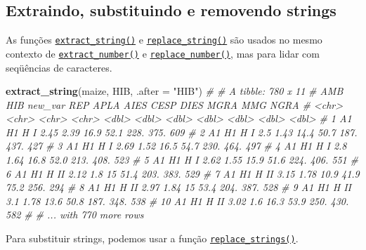 \documentclass[
]{book}
\newenvironment{Shaded}{\begin{snugshade}}{\end{snugshade}}
\newcommand{\CommentTok}[1]{\textcolor[rgb]{0.56,0.35,0.01}{\textit{#1}}}
\newcommand{\DataTypeTok}[1]{\textcolor[rgb]{0.13,0.29,0.53}{#1}}
\newcommand{\KeywordTok}[1]{\textcolor[rgb]{0.13,0.29,0.53}{\textbf{#1}}}
\newcommand{\NormalTok}[1]{#1}
\newcommand{\StringTok}[1]{\textcolor[rgb]{0.31,0.60,0.02}{#1}}
\begin{document}
\hypertarget{extraindo-substituindo-e-removendo-strings}{%
\subsection{Extraindo, substituindo e removendo strings}\label{extraindo-substituindo-e-removendo-strings}}

As funções \href{https://tiagoolivoto.github.io/metan/reference/utils_num_str.html}{\texttt{extract\_string()}} e \href{https://tiagoolivoto.github.io/metan/\%20reference\%20/\%20utils_num_str.html}{\texttt{replace\_string()}} são usados no mesmo contexto de \href{https://tiagoolivoto.github.io/metan/reference/utils_num_str.html}{\texttt{extract\_number()}} e \href{https\%20:\%20//tiagoolivoto.github.io/metan/reference/utils_num_str.html}{\texttt{replace\_number()}}, mas para lidar com seqüências de caracteres.

\begin{Shaded}
\begin{Highlighting}[]
\KeywordTok{extract_string}\NormalTok{(maize, HIB, }\DataTypeTok{.after =} \StringTok{"HIB"}\NormalTok{)}
\CommentTok{# # A tibble: 780 x 11}
\CommentTok{#    AMB   HIB   new_var REP    APLA  AIES  CESP  DIES  MGRA   MMG  NGRA}
\CommentTok{#    <chr> <chr> <chr>   <chr> <dbl> <dbl> <dbl> <dbl> <dbl> <dbl> <dbl>}
\CommentTok{#  1 A1    H1    H       I      2.45  2.39  16.9  52.1 228.   375.   609}
\CommentTok{#  2 A1    H1    H       I      2.5   1.43  14.4  50.7 187.   437.   427}
\CommentTok{#  3 A1    H1    H       I      2.69  1.52  16.5  54.7 230.   464.   497}
\CommentTok{#  4 A1    H1    H       I      2.8   1.64  16.8  52.0 213.   408.   523}
\CommentTok{#  5 A1    H1    H       I      2.62  1.55  15.9  51.6 224.   406.   551}
\CommentTok{#  6 A1    H1    H       II     2.12  1.8   15    51.4 203.   383.   529}
\CommentTok{#  7 A1    H1    H       II     3.15  1.78  10.9  41.9  75.2  256.   294}
\CommentTok{#  8 A1    H1    H       II     2.97  1.84  15    53.4 204.   387.   528}
\CommentTok{#  9 A1    H1    H       II     3.1   1.78  13.6  50.8 187.   348.   538}
\CommentTok{# 10 A1    H1    H       II     3.02  1.6   16.3  53.9 250.   430.   582}
\CommentTok{# # ... with 770 more rows}
\end{Highlighting}
\end{Shaded}


Para substituir strings, podemos usar a função \href{https://tiagoolivoto.github.io/metan/reference/utils_num_str.html}{\texttt{replace\_strings()}}.
\end{document}
